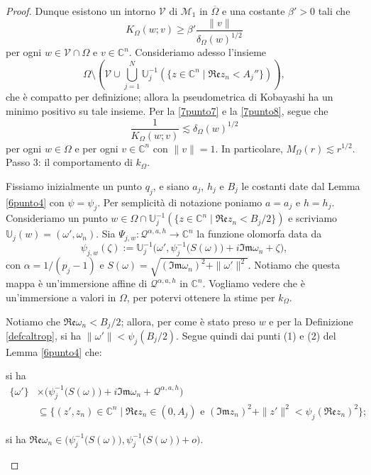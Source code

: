 \begin{proof}
    Dunque esistono un intorno $\mathcal{V}$ di $\mathcal{M}_1$ in $\overline{\Omega}$ e una costante $\beta'>0$ tali che
    \begin{equation}\label{7punto8}
        K_\Omega(w;v)\ge \beta'\frac{\|v\|}{\delta_\Omega(w)^{1/2}}
    \end{equation}
    per ogni $w\in\mathcal{V}\cap\Omega$ e $v\in\mathbb{C}^n$. Consideriamo adesso l'insieme
    $$\Omega\setminus\left(\mathcal{V}\cup\bigcup_{j=1}^N \mathbb{U}_j^{-1}(\{z\in\mathbb{C}^n\mid\mathfrak{Re}z_n<A_j''\})\right),$$
    che è compatto per definizione; allora la pseudometrica di Kobayashi ha un minimo positivo su tale insieme. Per la \eqref{7punto7} e la \eqref{7punto8}, segue che
    $$\frac{1}{K_\Omega(w;v)}\lesssim\delta_\Omega(w)^{1/2}$$
    per ogni $w\in\Omega$ e per ogni $v\in\mathbb{C}^n$ con $\|v\|=1$. In particolare, $M_\Omega(r)\lesssim r^{1/2}$.\\

    Passo 3: il comportamento di $k_\Omega$.

    Fissiamo inizialmente un punto $q_j$, e siano $a_j$, $h_j$ e $B_j$ le costanti date dal Lemma \ref{6punto4} con $\psi=\psi_j$. Per semplicità di notazione poniamo $a=a_j$ e $h=h_j$. Consideriamo un punto $w\in\Omega\cap\mathbb{U}_j^{-1}(\{z\in\mathbb{C}^n\mid\mathfrak{Re}z_n<B_j/2\})$ e scriviamo $\mathbb{U}_j(w)=(\omega',\omega_n)$. Sia $\Psi_{j,w}:\mathcal{Q}^{\alpha,a,h}\longrightarrow\mathbb{C}^n$ la funzione olomorfa data da
    $$\psi_{j,w}(\zeta):=\mathbb{U}_j^{-1}\Big(\omega',\psi_j^{-1}\big(S(\omega)\big)+i\mathfrak{Im}\omega_n+\zeta\Big),$$
    con $\alpha=1/(p_j-1)$ e $S(\omega)=\sqrt{(\mathfrak{Im}\omega_n)^2+\|\omega'\|^2}$. Notiamo che questa mappa è un'immersione affine di $\mathcal{Q}^{\alpha,a,h}$ in $\mathbb{C}^n$. Vogliamo vedere che è un'immersione a valori in $\Omega$, per potervi ottenere la stime per $k_\Omega$.

    Notiamo che $\mathfrak{Re}\omega_n<B_j/2$; allora, per come è stato preso $w$ e per la Definizione \ref{defcaltrop}, si ha $\|\omega'\|<\psi_j(B_j/2)$. Segue quindi dai punti (1) e (2) del Lemma \ref{6punto4} che:
    \begin{nlist}
        \item si ha
        \begin{align*}
            \{\omega'\}&\times\Big(\psi_j^{-1}\big(S(\omega)\big)+i\mathfrak{Im}\omega_n+\mathcal{Q}^{\alpha,a,h}\Big)\\
            &\subseteq \{(z',z_n)\in\mathbb{C}^n\mid\mathfrak{Re}z_n\in(0,A_j)\text{ e }(\mathfrak{Im}z_n)^2+\|z'\|^2<\psi_j(\mathfrak{Re}z_n)^2\};
        \end{align*}
        \item si ha $\mathfrak{Re}\omega_n\in\Big(\psi_j^{-1}\big(S(\omega)\big),\psi_j^{-1}\big(S(\omega)\big)+o\Big)$.
    \end{nlist}


\end{proof}
